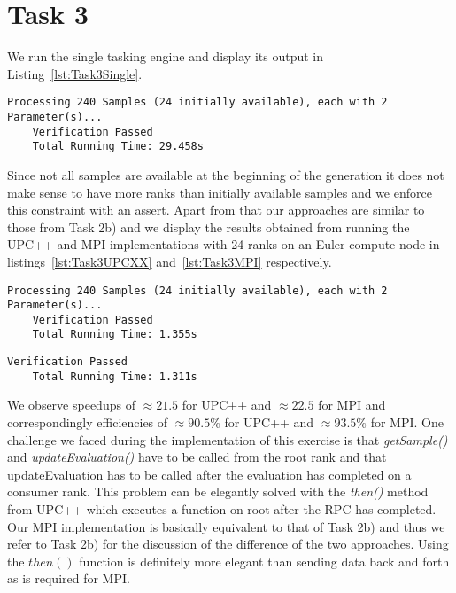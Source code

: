 \documentclass[11pt]{article}
\begin{document}
    \section*{Task 3}
    \label{sec:Task3}

    We run the single tasking engine and display its output in
    Listing~\ref{lst:Task3Single}.

    \begin{lstlisting}[basicstyle=\tiny, frame=single, caption={Output from
    executing the single tasking engine.}, label={lst:Task3Single}]
    Processing 240 Samples (24 initially available), each with 2 Parameter(s)...
    Verification Passed
    Total Running Time: 29.458s
    \end{lstlisting}

    Since not all samples are available at the beginning of the generation
    it does not make sense to have more ranks than initially available
    samples and we enforce this constraint with an assert.
    Apart from that our approaches are similar to those from Task 2b) and we
    display the results obtained from running the UPC++ and MPI
    implementations with 24 ranks on an Euler compute node in
    listings~\ref{lst:Task3UPCXX} and~\ref{lst:Task3MPI} respectively.

    \begin{lstlisting}[basicstyle=\tiny, frame=single, caption={Output from
    executing the UPC++ tasking engine .},
    label={lst:Task3UPCXX}]
    Processing 240 Samples (24 initially available), each with 2 Parameter(s)...
    Verification Passed
    Total Running Time: 1.355s
    \end{lstlisting}

    \begin{lstlisting}[basicstyle=\tiny, frame=single, caption={Output from
    executing the MPI tasking engine .},
    label={lst:Task3MPI}]
    Verification Passed
    Total Running Time: 1.311s
    \end{lstlisting}

    We observe speedups of $\approx 21.5$ for UPC++ and $\approx 22.5$ for
    MPI and correspondingly efficiencies of $\approx 90.5\%$ for UPC++ and
    $\approx 93.5\%$ for MPI.\@
    One challenge we faced during the implementation of this exercise is
    that \mbox{\textit{getSample()}} and \mbox{\textit{updateEvaluation()}}
    have to be called from the root rank and that updateEvaluation has to be
    called after the evaluation has completed on a consumer rank.
    This problem can be elegantly solved with the \textit{then()} method
    from UPC++ which executes a function on root after the RPC has completed.
    Our MPI implementation is basically equivalent to that of Task 2b) and
    thus we refer to Task 2b) for the discussion of the difference of the two
    approaches.
    Using the $then()$ function is definitely more elegant than sending data
    back and forth as is required for MPI.\@
\end{document}
